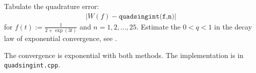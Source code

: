 \begin{problem}
\begin{subproblem}[2]
 \end{subproblem}

%   
%     
 
 \begin{subproblem}[1]
  Tabulate the quadrature error:
   \begin{align*}
    \lvert W(f) - \texttt{quadsingint(f,n)} \rvert
   \end{align*}
   for $f(t) := \frac{1}{2+\exp(3t)}$ and $n = 1,2,...,25$. Estimate the $0 < q <
   1$ in the decay law of exponential convergence, see . 

  \cprotEnv   \begin{solution}
   The convergence is exponential with both methods. The \Cpp{} implementation is in \verb|quadsingint.cpp|.
   \end{solution}

 \end{subproblem}

 
\end{problem}
